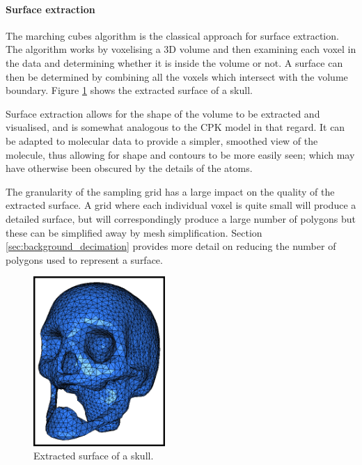 
\paragraph{Surface extraction}

The marching cubes algorithm \citep{lorensen87} is the classical approach for
surface extraction. The algorithm works by voxelising a 3D volume and then
examining each voxel in the data and determining whether it is inside the
volume or not. A surface can then be determined by combining all the voxels
which intersect with the volume boundary. Figure \ref{fig:background_mesh}
shows the extracted surface of a skull.

Surface extraction allows for the shape of the volume to be extracted and
visualised, and is somewhat analogous to the CPK model in that regard. It can
be adapted to molecular data to provide a simpler, smoothed view of the
molecule, thus allowing for shape and contours to be more easily seen; which
may have otherwise been obscured by the details of the atoms.

The granularity of the sampling grid has a large impact on the quality of the
extracted surface. A grid where each individual voxel is quite small will
produce a detailed surface, but will correspondingly produce a large number of
polygons but these can be simplified away by mesh simplification. Section
\ref{sec:background_decimation} provides more detail on reducing the number of
polygons used to represent a surface.

\begin{figure}
  \begin{center}
    \includegraphics[width=50mm]{surface_mesh}
  \end{center}
  \caption{Extracted surface of a skull.}
  \label{fig:background_mesh}
\end{figure}

